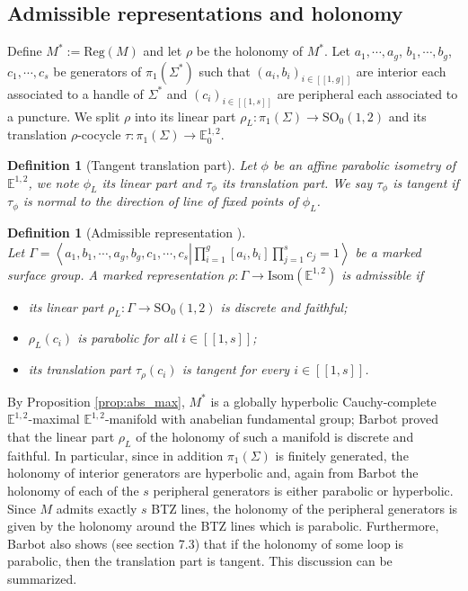\documentclass[a4paper,12pt]{article}
\def\GG{\SO_0(1,2)}
\def\isom{Isom}
\def\lsem{[\![}
\def\rsem{]\!]}
\def\E{\mathbf E}
\def\SO{\mathrm{SO}}
\def\E{\mathbb{E}}
\newcommand{\mass}[1]{{\mathbb E}^{1,2}_{#1}}
\def\isom{\mathrm{Isom}}
\def\Reg{\mathrm{Reg}}
\def\reg{\Reg}
\newtheorem{defou}[lemou]{Definition}    %
\begin{document}

\subsection{Admissible representations and holonomy}
\label{sec:admissible_rep}

Define $M^*:=\reg(M)$ and let $\rho$ be the holonomy of $M^*$. Let $a_1,\cdots,a_g$, $b_1, \cdots,b_g$, $c_1,\cdots,c_s$ 
be generators of $\pi_1(\Sigma^*)$  such that $(a_i,b_i)_{i\in \lsem 1,g\rsem}$ are interior each associated to a handle of $\Sigma^*$ and $(c_i)_{i\in \lsem 1,s\rsem}$ are peripheral each associated to a puncture. 
We split $\rho$  into its linear part $\rho_L: \pi_1(\Sigma)\rightarrow \GG$ and its translation $\rho$-cocycle $\tau: \pi_1(\Sigma)\rightarrow \mass{0}$.

\begin{defou}[Tangent translation part] Let $\phi$ be an affine parabolic isometry of $\mass{}$, we note $\phi_L$ its linear part and $\tau_\phi$ its translation part.
We say $\tau_\phi$ is tangent if $\tau_\phi$ is normal to the direction of line of fixed points of $\phi_L$.
 
\end{defou}
\begin{defou}[Admissible representation ] \ \\ Let $\Gamma = \left\langle a_1,b_1,\cdots,a_g,b_g, c_1,\cdots,c_s \left |  \prod_{i=1}^g [a_i,b_i] \prod_{j=1}^s c_j=1\right.\right\rangle$
be a marked surface group.
A marked representation $\rho:\Gamma \rightarrow \isom(\E^{1,2})$ is admissible if 
\begin{itemize}
 \item its linear part $\rho_L: \Gamma \rightarrow \GG$ is discrete and faithful;
 \item $\rho_L(c_i)$ is parabolic for all $i\in \lsem 1,s\rsem$;
 \item its translation part $\tau_\rho(c_i)$ is tangent for every $i\in \lsem 1,s\rsem$.
\end{itemize}
\end{defou}

By Proposition \ref{prop:abs_max}, $M^*$ is a globally hyperbolic Cauchy-complete $\mass{}$-maximal $\mass{}$-manifold with anabelian fundamental group; Barbot \cite{barbot_globally_2004} proved that the linear part $\rho_L$ of the holonomy of such a manifold is discrete and faithful. In particular, since in addition $\pi_1(\Sigma)$ is finitely generated, the holonomy of interior generators are hyperbolic \cite{MR1177168} and, again from Barbot \cite{barbot_globally_2004} the holonomy of each of the $s$ peripheral generators is either parabolic or hyperbolic.
 Since $M$ admits exactly $s$ BTZ lines, the holonomy of the peripheral generators is given by the holonomy around the BTZ lines which is parabolic. Furthermore, Barbot also shows (see \cite{barbot_globally_2004}  section 7.3) that if the holonomy of some loop is parabolic, then  the translation part is tangent. 
This discussion can be summarized.
\end{document}
